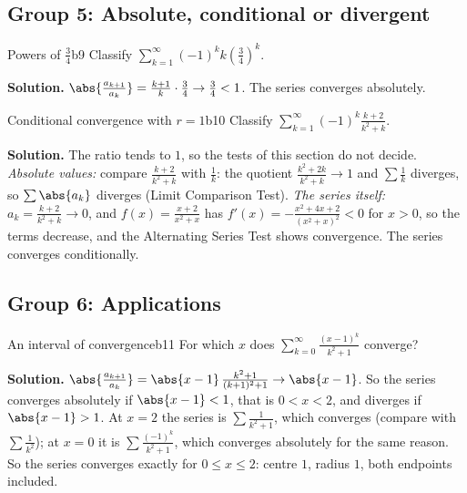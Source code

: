 \documentclass[11pt]{article}
\begin{document}
\subsection*{Group 5: Absolute, conditional or divergent}

\begin{exmp}{Powers of $\frac34$}{b9}
Classify $\displaystyle\sum_{k=1}^\infty(-1)^kk\left(\frac34\right)^k$.

\textbf{Solution.} $\abs{\frac{a_{k+1}}{a_k}}=\frac{k+1}k\cdot\frac34\to\frac34<1$. The series converges absolutely.
\end{exmp}

\begin{exmp}{Conditional convergence with $r=1$}{b10}
Classify $\displaystyle\sum_{k=1}^\infty(-1)^k\frac{k+2}{k^2+k}$.

\textbf{Solution.} The ratio tends to $1$, so the tests of this section do not decide. \emph{Absolute values:} compare $\frac{k+2}{k^2+k}$ with $\frac1k$: the quotient $\frac{k^2+2k}{k^2+k}\to1$ and $\sum\frac1k$ diverges, so $\sum\abs{a_k}$ diverges (Limit Comparison Test). \emph{The series itself:} $a_k=\frac{k+2}{k^2+k}\to0$, and $f(x)=\frac{x+2}{x^2+x}$ has $f'(x)=-\frac{x^2+4x+2}{(x^2+x)^2}<0$ for $x>0$, so the terms decrease, and the Alternating Series Test shows convergence. The series converges conditionally.
\end{exmp}

\subsection*{Group 6: Applications}

\begin{exmp}{An interval of convergence}{b11}
For which $x$ does $\displaystyle\sum_{k=0}^\infty\frac{(x-1)^k}{k^2+1}$ converge?

\textbf{Solution.} $\abs{\frac{a_{k+1}}{a_k}}=\abs{x-1}\,\frac{k^2+1}{(k+1)^2+1}\to\abs{x-1}$. So the series converges absolutely if $\abs{x-1}<1$, that is $0<x<2$, and diverges if $\abs{x-1}>1$. At $x=2$ the series is $\sum\frac1{k^2+1}$, which converges (compare with $\sum\frac1{k^2}$); at $x=0$ it is $\sum\frac{(-1)^k}{k^2+1}$, which converges absolutely for the same reason. So the series converges exactly for $0\le x\le2$: centre $1$, radius $1$, both endpoints included.
\end{exmp}
\end{document}
